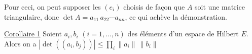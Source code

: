 
Pour ceci, on peut supposer les $(e_i)$ choisis de façon
que $A$ soit une matrice triangulaire, donc
$\det A=a_{11}\,a_{22}\cdots a_{nn}$, ce qui achève la démonstration.

\uline{Corollaire 1} Soient $a_i,b_i$ $(i=1,\ldots,n)$ des éléments d'un espace
de Hilbert $E$. Alors on a $|\det((a_i,b_j))|\leq\prod_i\|a_i\|\,\|b_i\|$

